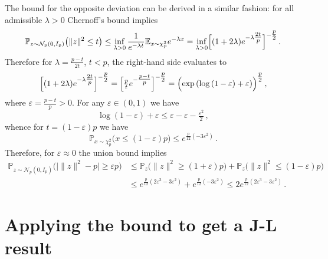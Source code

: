 \documentclass[a4paper,10pt]{article}
\begin{document}
The bound for the opposite deviation can be derived in a similar fashion: for all
admissible $\lambda > 0$ Chernoff's bound implies
\begin{equation*}
  \mathbb{P}_{z \sim \mathcal{N}_p(0, I_p)}\bigl(
      \|z\|^2 \leq t
  \bigr)
    \leq \inf_{\lambda > 0} \frac1{e^{-\lambda t}} \mathbb{E}_{x \sim \chi^2_p} e^{-\lambda x}
    = \inf_{\lambda > 0} \Bigl[(1 + 2\lambda) e^{- \lambda \tfrac{2 t}{p}} \Bigr]^{-\tfrac{p}2}
    \,.
\end{equation*}
Therefore for $\lambda = \tfrac{p - t}{2 t}$, $t < p$, the right-hand side evaluates to
$$
  \Bigl[(1 + 2\lambda) e^{- \lambda \tfrac{2 t}{p}} \Bigr]^{-\tfrac{p}2}
    = \Bigl[\tfrac{p}{t} e^{- \tfrac{p - t}{p}} \Bigr]^{-\tfrac{p}2}
    = \Bigl( \exp{(\log{(1 - \varepsilon)} + \varepsilon)} \Bigr)^{\tfrac{p}2}
    \,, $$
where $\varepsilon = \tfrac{p - t}{p} > 0$. For any $\varepsilon \in (0, 1)$ we have
$$
  \log{(1 - \varepsilon)} + \varepsilon
    \leq \varepsilon - \varepsilon - \tfrac{\varepsilon^2}2
    \,, $$
whence for $t = (1 - \varepsilon) p$ we have
$$
  \mathbb{P}_{x \sim\chi^2_p} \bigl( x \leq (1 - \varepsilon) p \bigr)
    \leq e^{\tfrac{p}{12} (- 3 \varepsilon^2)}
    \,. $$
Therefore, for $\varepsilon\approx 0$ the union bound implies
\begin{align*}
  \mathbb{P}_{z \sim \mathcal{N}_p(0, I_p)}\bigl(
      \lvert \|z\|^2 - p \rvert \geq \varepsilon p
  \bigr)
    &\leq \mathbb{P}_{z}\bigl(
        \|z\|^2 \geq (1 + \varepsilon) p
      \bigr)
      + \mathbb{P}_{z}\bigl(
        \|z\|^2 \leq (1 - \varepsilon) p
      \bigr)
    \\
    &\leq e^{\tfrac{p}{12} (2 \varepsilon^3 - 3 \varepsilon^2)} + e^{\tfrac{p}{12} (- 3 \varepsilon^2)}
    \leq 2 e^{\tfrac{p}{12} (2 \varepsilon^3 - 3 \varepsilon^2)}
    \,.
\end{align*}




\section{Applying the bound to get a J-L result} %
\label{sec:applying_the_bound_to_get_a_j_l_result}
\end{document}
